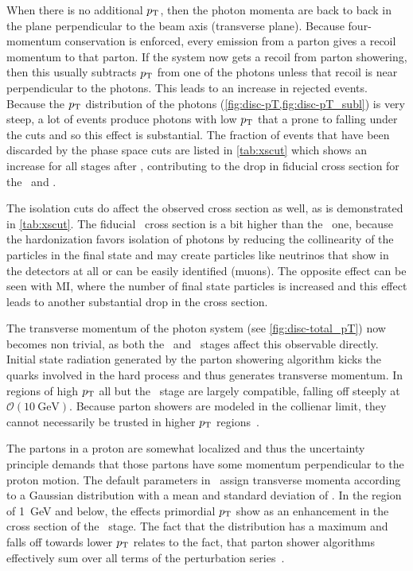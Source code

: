 When there is no additional \(p_\mathrm{T}\), then the photon momenta are back
to back in the plane perpendicular to the beam axis (transverse
plane). Because four-momentum conservation is enforced, every emission
from a parton gives a recoil momentum to that parton. If the system
now gets a recoil from parton showering, then this usually subtracts
\(p_\mathrm{T}\) from one of the photons unless that recoil is near
perpendicular to the photons. This leads to an increase in rejected
events. Because the \(p_\mathrm{T}\) distribution of the photons
(\cref{fig:disc-pT,fig:disc-pT_subl}) is very steep, a lot of events
produce photons with low \(p_\mathrm{T}\) that a prone to falling under the
cuts and so this effect is substantial. The fraction of events that
have been discarded by the phase space cuts are listed in
\cref{tab:xscut} which shows an increase for all stages after \stone,
contributing to the drop in fiducial cross section for the \sttwo\ and
\stthree.

The isolation cuts do affect the observed cross section as well, as is
demonstrated in \cref{tab:xscut}. The fiducial \stfour\ cross section
is a bit higher than the \stthree\ one, because the hardonization
favors isolation of photons by reducing the collinearity of the
particles in the final state and may create particles like neutrinos
that show in the detectors at all or can be easily identified
(muons). The opposite effect can be seen with MI, where the number of
final state particles is increased and this effect leads to another
substantial drop in the cross section.

The transverse momentum of the photon system (see
\cref{fig:disc-total_pT}) now becomes non trivial, as both the \sttwo\
and \stthree\ stages affect this observable directly. Initial state
radiation generated by the parton showering algorithm kicks the quarks
involved in the hard process and thus generates transverse momentum.
In regions of high \(p_\mathrm{T}\) all but the \stone\ stage are largely
compatible, falling off steeply at
\(\mathcal{O}(\SI{10}{\giga\electronvolt})\). Because parton showers
are modeled in the collienar limit, they cannot necessarily be trusted
in higher \(p_\mathrm{T}\) regions~\cite{buckley:2011ge}.

The partons in a proton are somewhat localized and thus the
uncertainty principle demands that those partons have some momentum
perpendicular to the proton motion. The default parameters in \sherpa\
assign transverse momenta according to a Gaussian distribution with a
mean and standard deviation of \gev{.8}.  In the region of
\SI{1}{\giga\electronvolt} and below, the effects primordial \(p_\mathrm{T}\)
show as an enhancement in the cross section of the \stthree\ stage.
The fact that the distribution has a maximum and falls off towards
lower \(p_\mathrm{T}\) relates to the fact, that parton shower algorithms
effectively sum over all terms of the perturbation
series~\cite{buckley:2011ge}.

